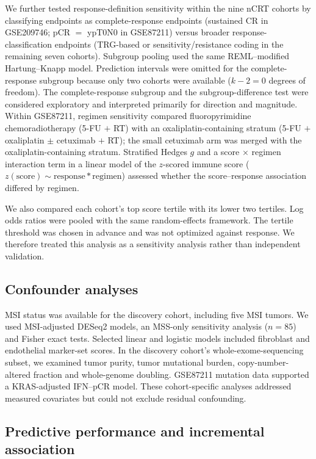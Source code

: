 \documentclass[11pt,a4paper]{article}
\begin{document}
We further tested response-definition sensitivity within the nine nCRT cohorts by classifying endpoints as complete-response endpoints (sustained CR in GSE209746; pCR $=$ ypT0N0 in GSE87211) versus broader response-classification endpoints (TRG-based or sensitivity/resistance coding in the remaining seven cohorts). Subgroup pooling used the same REML--modified Hartung--Knapp model. Prediction intervals were omitted for the complete-response subgroup because only two cohorts were available ($k-2=0$ degrees of freedom). The complete-response subgroup and the subgroup-difference test were considered exploratory and interpreted primarily for direction and magnitude. Within GSE87211, regimen sensitivity compared fluoropyrimidine chemoradiotherapy (5-FU $+$ RT) with an oxaliplatin-containing stratum (5-FU $+$ oxaliplatin $\pm$ cetuximab $+$ RT); the small cetuximab arm was merged with the oxaliplatin-containing stratum. Stratified Hedges $g$ and a score $\times$ regimen interaction term in a linear model of the $z$-scored immune score ($z(\mathrm{score}) \sim \mathrm{response} * \mathrm{regimen}$) assessed whether the score--response association differed by regimen.

We also compared each cohort's top score tertile with its lower two tertiles. Log odds ratios were pooled with the same random-effects framework. The tertile threshold was chosen in advance and was not optimized against response. We therefore treated this analysis as a sensitivity analysis rather than independent validation.

\subsection{Confounder analyses}

MSI status was available for the discovery cohort, including five MSI tumors. We used MSI-adjusted DESeq2 models, an MSS-only sensitivity analysis ($n=85$) and Fisher exact tests. Selected linear and logistic models included fibroblast and endothelial marker-set scores. In the discovery cohort's whole-exome-sequencing subset, we examined tumor purity, tumor mutational burden, copy-number-altered fraction and whole-genome doubling. GSE87211 mutation data supported a KRAS-adjusted IFN--pCR model. These cohort-specific analyses addressed measured covariates but could not exclude residual confounding.

\subsection{Predictive performance and incremental association}
\end{document}
